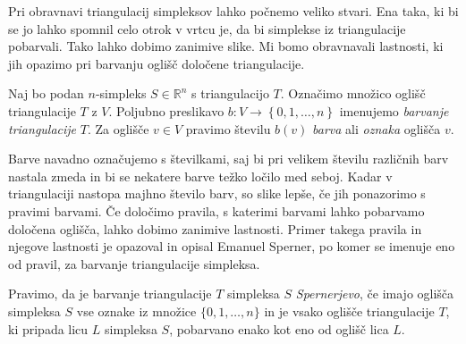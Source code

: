 \documentclass[mat1]{fmfdelo}
\newcommand{\R}{\mathbb R}
\newcommand{\0}{\underline{0}}
\begin{document}
Pri obravnavi triangulacij simpleksov lahko počnemo veliko stvari. Ena taka, ki bi se jo lahko spomnil celo otrok v vrtcu je, da bi simplekse iz triangulacije pobarvali. Tako lahko dobimo zanimive slike. Mi bomo obravnavali lastnosti, ki jih opazimo pri barvanju oglišč določene triangulacije.
\begin{definicija}
Naj bo podan $n$-simpleks $S \in \R^n$ s triangulacijo $T$. Označimo množico oglišč triangulacije $T$ z $V$. Poljubno preslikavo $b : V \to \left \{0, 1, \dots, n \right \} $ imenujemo \emph{barvanje triangulacije} $T$. Za oglišče $v \in V$ pravimo številu $b(v)$ \emph{barva} ali \emph{oznaka} oglišča $v$.
\end{definicija}
Barve navadno označujemo s številkami, saj bi pri velikem številu različnih barv nastala zmeda in bi se nekatere barve težko ločilo med seboj. Kadar v triangulaciji nastopa majhno število barv, so slike lepše, če jih ponazorimo s pravimi barvami. Če določimo pravila, s katerimi barvami lahko pobarvamo določena oglišča, lahko dobimo zanimive lastnosti. Primer takega pravila in njegove lastnosti je opazoval in opisal Emanuel Sperner, po komer se imenuje eno od pravil, za barvanje triangulacije simpleksa.
\begin{definicija}
Pravimo, da je barvanje triangulacije $T$ simpleksa $S$ \emph{Spernerjevo}, če imajo oglišča simpleksa $S$ vse oznake iz množice $\{ 0, 1, \dots, n \}$ in je vsako oglišče triangulacije $T$, ki pripada licu $L$ simpleksa $S$, pobarvano enako kot eno od oglišč lica $L$.

\end{definicija}
\newcommand*\rows{6}
\newcommand*\vel{1.8}
\end{document}
